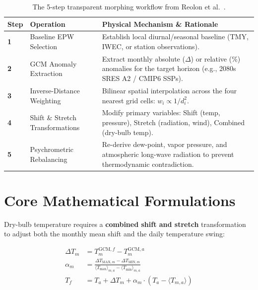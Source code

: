 \documentclass[10pt,a4paper]{article}
\begin{document}
\begin{table}[h!]
\centering
\small
\begin{tabularx}{\textwidth}{llX}
\toprule
\textbf{Step} & \textbf{Operation} & \textbf{Physical Mechanism \& Rationale} \\
\midrule
\textbf{1} & Baseline EPW Selection & Establish local diurnal/seasonal baseline (TMY, IWEC, or station observations). \\
\textbf{2} & GCM Anomaly Extraction & Extract monthly absolute ($\Delta$) or relative (\%) anomalies for the target horizon (e.g., 2080s SRES A2 / CMIP6 SSPs). \\
\textbf{3} & Inverse-Distance Weighting & Bilinear spatial interpolation across the four nearest grid cells: $w_i \propto 1 / d_i^2$. \\
\textbf{4} & Shift \& Stretch Transformations & Modify primary variables: Shift (temp, pressure), Stretch (radiation, wind), Combined (dry-bulb temp). \\
\textbf{5} & Psychrometric Rebalancing & Re-derive dew-point, vapor pressure, and atmospheric long-wave radiation to prevent thermodynamic contradiction. \\
\bottomrule
\end{tabularx}
\caption{The 5-step transparent morphing workflow from Reolon et al.\ \cite{Reolon2026_EnergyPlusWeather}.}
\end{table}

\section{Core Mathematical Formulations}

Dry-bulb temperature requires a \textbf{combined shift and stretch} transformation to adjust both the monthly mean shift and the daily temperature swing:

\begin{infobox}
\begin{align}
\Delta T_m &= T_m^{\text{GCM},f} - T_m^{\text{GCM},a} \label{eq:delta_t} \\
\alpha_m &= \frac{\Delta T_{\text{MAX},m} - \Delta T_{\text{MIN},m}}{\langle T_{\text{max}} \rangle_{m,a} - \langle T_{\text{min}} \rangle_{m,a}} \label{eq:alpha} \\
T_f &= T_a + \Delta T_m + \alpha_m \cdot (T_a - \langle T_{m,a} \rangle) \label{eq:tf}
\end{align}
\end{infobox}
\end{document}
